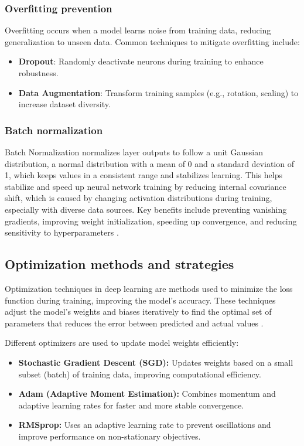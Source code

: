 \subsubsection{Overfitting prevention}
Overfitting occurs when a model learns noise from training data, reducing generalization to unseen data. Common techniques to mitigate overfitting include:
\begin{itemize}
    \item \textbf{Dropout}: Randomly deactivate neurons during training to enhance robustness.
    \item \textbf{Data Augmentation}: Transform training samples (e.g., rotation, scaling) to increase dataset diversity.
\end{itemize}

\subsubsection{Batch normalization}
Batch Normalization normalizes layer outputs to follow a unit Gaussian distribution, a normal distribution with a mean of 0 and a standard deviation of 1, which keeps values in a consistent range and stabilizes learning. This helps stabilize and speed up neural network training by reducing internal covariance shift, which is caused by changing activation distributions during training, especially with diverse data sources. Key benefits include preventing vanishing gradients, improving weight initialization, speeding up convergence, and reducing sensitivity to hyperparameters \parencite{alzubaidi2021review}.


\subsection{Optimization methods and strategies}
Optimization techniques in deep learning are methods used to minimize the loss function during training, improving the model’s accuracy. These techniques adjust the model's weights and biases iteratively to find the optimal set of parameters that reduces the error between predicted and actual values \parencite{alzubaidi2021review}.

Different optimizers are used to update model weights efficiently:

\begin{itemize}
    \item \textbf{Stochastic Gradient Descent (SGD):} Updates weights based on a small subset (batch) of training data, improving computational efficiency.
    \item \textbf{Adam (Adaptive Moment Estimation):} Combines momentum and adaptive learning rates for faster and more stable convergence.
    \item \textbf{RMSprop:} Uses an adaptive learning rate to prevent oscillations and improve performance on non-stationary objectives.
\end{itemize}

